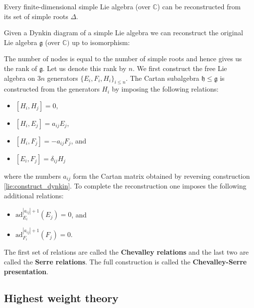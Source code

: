     \begin{theorem}
        Every finite-dimensional simple Lie algebra (over $\mathbb{C}$) can be reconstructed from its set of simple roots $\Delta$.
    \end{theorem}
    \begin{construct}\label{lie:reconstruction}
        Given a Dynkin diagram of a simple Lie algebra we can reconstruct the original Lie algebra $\mathfrak{g}$ (over $\mathbb{C})$ up to isomorphism:

        \qquad The number of nodes is equal to the number of simple roots and hence gives us the rank of $\mathfrak{g}$. Let us denote this rank by $n$. We first construct the free Lie algebra on $3n$ generators $\{E_i,F_i,H_i\}_{i\leq n}$. The Cartan subalgebra $\mathfrak{h}\leq\mathfrak{g}$ is constructed from the generators $H_i$ by imposing the following relations:
        \begin{itemize}
            \item $[H_i,H_j] = 0$,
            \item $[H_i,E_j] = a_{ij}E_j$,
            \item $[H_i,F_j] = -a_{ij}F_j$, and
            \item $[E_i,F_j] = \delta_{ij}H_j$
        \end{itemize}
        where the numbers $a_{ij}$ form the Cartan matrix obtained by reversing construction \ref{lie:construct_dynkin}. To complete the reconstruction one imposes the following additional relations:
        \begin{itemize}
            \item $\text{ad}_{E_i}^{|a_{ij}|+1}(E_j) = 0$, and
            \item $\text{ad}_{F_i}^{|a_{ij}|+1}(F_j) = 0$.
        \end{itemize}
        The first set of relations are called the \textbf{Chevalley relations} and the last two are called the \textbf{Serre relations}. The full construction is called the \textbf{Chevalley-Serre presentation}.
    \end{construct}

\subsection{Highest weight theory}

